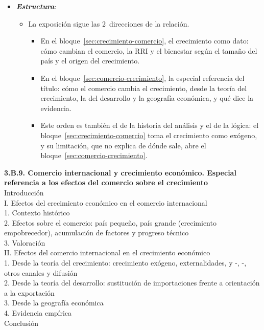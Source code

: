 \documentclass[11pt]{article}
\begin{document}
\begin{itemize}
\item \textbf{\emph{Estructura}}:
  \begin{itemize}
  \item La exposición sigue las 2~direcciones de la relación.
    \begin{itemize}
    \item En el bloque~\ref{sec:crecimiento-comercio}, el crecimiento como dato: cómo cambian el comercio, la RRI y el bienestar según el tamaño del país y el origen del crecimiento.
    \item En el bloque~\ref{sec:comercio-crecimiento}, la especial referencia del título: cómo el comercio cambia el crecimiento, desde la teoría del crecimiento, la del desarrollo y la geografía económica, y qué dice la evidencia.
    \item Este orden es también el de la historia del análisis y el de la lógica: el bloque~\ref{sec:crecimiento-comercio} toma el crecimiento como exógeno, y su limitación, que no explica de dónde sale, abre el bloque~\ref{sec:comercio-crecimiento}.
    \end{itemize}
  \end{itemize}
\end{itemize}

\begin{esquema}
\textbf{3.B.9. Comercio internacional y crecimiento económico. Especial referencia a los efectos del comercio sobre el crecimiento}\\[2pt]
Introducción\\
I. Efectos del crecimiento económico en el comercio internacional\\
\hspace*{1.5em}1. Contexto histórico\\
\hspace*{1.5em}2. Efectos sobre el comercio: país pequeño, país grande (crecimiento empobrecedor), acumulación de factores y progreso técnico\\
\hspace*{1.5em}3. Valoración\\
II. Efectos del comercio internacional en el crecimiento económico\\
\hspace*{1.5em}1. Desde la teoría del crecimiento: crecimiento exógeno, externalidades,  y -, -, otros canales y difusión\\
\hspace*{1.5em}2. Desde la teoría del desarrollo: sustitución de importaciones frente a orientación a la exportación\\
\hspace*{1.5em}3. Desde la geografía económica\\
\hspace*{1.5em}4. Evidencia empírica\\
Conclusión
\end{esquema}
\end{document}

